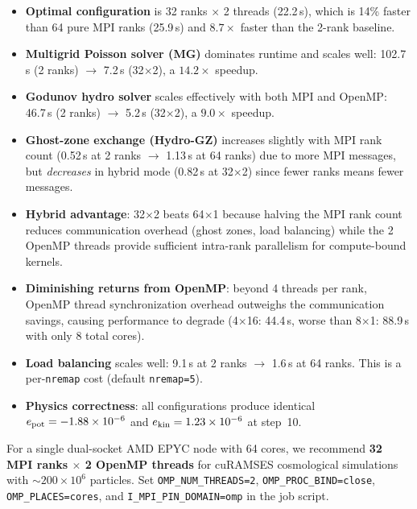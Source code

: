 \documentclass[11pt,fleqn]{book}
\begin{document}
\begin{itemize}
\item \textbf{Optimal configuration} is 32 ranks $\times$ 2 threads (22.2\,s), which is 14\% faster than 64 pure MPI ranks (25.9\,s) and $8.7\times$ faster than the 2-rank baseline.

\item \textbf{Multigrid Poisson solver (MG)} dominates runtime and scales well: 102.7\,s (2 ranks) $\to$ 7.2\,s (32$\times$2), a $14.2\times$ speedup.

\item \textbf{Godunov hydro solver} scales effectively with both MPI and OpenMP: 46.7\,s (2 ranks) $\to$ 5.2\,s (32$\times$2), a $9.0\times$ speedup.

\item \textbf{Ghost-zone exchange (Hydro-GZ)} increases slightly with MPI rank count (0.52\,s at 2 ranks $\to$ 1.13\,s at 64 ranks) due to more MPI messages, but \emph{decreases} in hybrid mode (0.82\,s at 32$\times$2) since fewer ranks means fewer messages.

\item \textbf{Hybrid advantage}: 32$\times$2 beats 64$\times$1 because halving the MPI rank count reduces communication overhead (ghost zones, load balancing) while the 2 OpenMP threads provide sufficient intra-rank parallelism for compute-bound kernels.

\item \textbf{Diminishing returns from OpenMP}: beyond 4 threads per rank, OpenMP thread synchronization overhead outweighs the communication savings, causing performance to degrade (4$\times$16: 44.4\,s, worse than 8$\times$1: 88.9\,s with only 8 total cores).

\item \textbf{Load balancing} scales well: 9.1\,s at 2 ranks $\to$ 1.6\,s at 64 ranks.  This is a per-\texttt{nremap} cost (default \texttt{nremap=5}).

\item \textbf{Physics correctness}: all configurations produce identical $e_{\rm pot} = -1.88 \times 10^{-6}$ and $e_{\rm kin} = 1.23 \times 10^{-6}$ at step~10.
\end{itemize}

\begin{infobox}
For a single dual-socket AMD EPYC node with 64 cores, we recommend \textbf{32 MPI ranks $\times$ 2 OpenMP threads} for cuRAMSES cosmological simulations with $\sim$$200 \times 10^6$ particles.  Set \texttt{OMP\_NUM\_THREADS=2}, \texttt{OMP\_PROC\_BIND=close}, \texttt{OMP\_PLACES=cores}, and \texttt{I\_MPI\_PIN\_DOMAIN=omp} in the job script.
\end{infobox}
\end{document}
